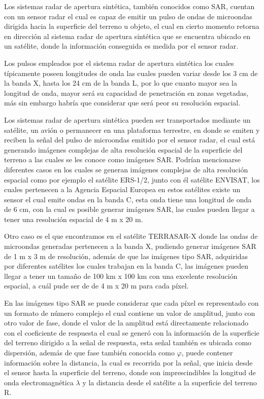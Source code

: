 Los sistemas radar de apertura sintética, también conocidos como SAR, cuentan con un sensor radar el cual es capaz de emitir un pulso de ondas de microondas dirigida hacia la superficie del terreno u objeto, el cual en cierto momento retorna en dirección al sistema radar de apertura sintética que se encuentra ubicado en un satélite, donde la información conseguida es medida por el sensor radar. 

Los pulsos empleados por el sistema radar de apertura sintética los cuales típicamente poseen longitudes de onda las cuales pueden variar desde los 3 cm de la banda X, hasta los 24 cm de la banda L, por lo que cuanto mayor sea la longitud de onda, mayor será su capacidad de penetración en zonas vegetadas, más sin embargo habría que considerar que será peor su resolución espacial.

Los sistemas radar de apertura sintética pueden ser transportados mediante un satélite, un avión o permanecer en una plataforma terrestre, en donde se emiten y reciben la señal del pulso de microondas emitido por el sensor radar, el cual está generando imágenes complejas de alta resolución espacial de la superficie del terreno a las cuales se les conoce como imágenes SAR. 
Podrían mencionarse diferentes casos en los cuales se generan imágenes complejas de alta resolución espacial como por ejemplo el satélite ERS-1/2, junto con él satélite ENVISAT, los cuales pertenecen a la Agencia Espacial Europea en estos satélites existe un sensor el cual emite ondas en la banda C, esta onda tiene una longitud de onda de 6 cm, con la cual es posible generar imágenes SAR, las cuales pueden llegar a tener una resolución espacial de 4 m x 20 m. 

Otro caso es el que encontramos en el satélite TERRASAR-X donde las ondas de microondas generadas pertenecen a la banda X, pudiendo generar imágenes SAR de 1 m x 3 m de resolución, además de que las imágenes tipo SAR, adquiridas por diferentes satélites los cuales trabajan en la banda C, las imágenes pueden llegar a tener un tamaño de 100 km x 100 km con una excelente resolución espacial, a cuál pude ser de de 4 m x 20 m para cada píxel. 

En las imágenes tipo SAR se puede considerar que cada píxel es representado con un formato de número complejo el cual contiene un valor de amplitud, junto con otro valor de fase, donde el valor de la amplitud está directamente relacionado con el coeficiente de respuesta el cual se generó con la información de la superficie del terreno dirigido a la señal de respuesta, esta señal también es ubicada como dispersión, además de que fase también conocida como $\varphi$, puede contener información sobre la distancia, la cual es recorrida por la señal, que inicia desde el sensor hasta la superficie del terreno, donde son imprescindibles la longitud de onda electromagnética $\lambda$ y la distancia desde el satélite a la superficie del terreno R.


